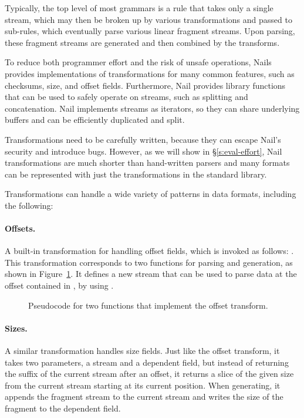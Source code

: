 Typically, the top level of most grammars is a rule that takes only a single stream, which may then
be broken up by various transformations and passed to sub-rules, which eventually parse various linear
fragment streams. Upon parsing, these fragment streams are generated and then combined by the
transforms.

 To reduce both programmer effort and the risk of unsafe operations, Nails provides implementations of
transformations for many common features, such as checksums, size, and offset fields. Furthermore,
Nail provides library functions that can be used to safely operate on streams, such as splitting and
concatenation. Nail implements streams as iterators, so they can share underlying buffers and can be
efficiently duplicated and split.

Transformations need to be carefully written, because they can escape Nail's security and introduce
bugs. However, as we will show in \S\ref{s:eval-effort}, Nail transformations are much shorter than
hand-written parsers and many formats can be represented with just the transformations in the
standard library. 

Transformations can handle a wide variety of patterns in data formats, including the following: 
\paragraph{Offsets.}
A built-in transformation for handling offset fields, which is invoked as follows:
. 
This transformation corresponds to two functions for parsing and
generation, as shown in Figure~\ref{fig:xform-sig}. It defines a new stream  that can
be used to parse data at the offset contained in , by
using .

\begin{figure}[h]
\smaller[0.5]

\caption{Pseudocode for two functions that implement the offset transform.}
\label{fig:xform-sig}
\end{figure}


\paragraph{Sizes.}
A similar transformation handles size fields. Just like the offset transform, it takes two parameters, a
stream and a dependent field, but instead of returning the suffix of the current stream after an
offset, it returns a slice of the given size from the current stream starting at its current
position. When generating, it appends the fragment stream to the current stream and writes the size
of the fragment to the dependent field.

